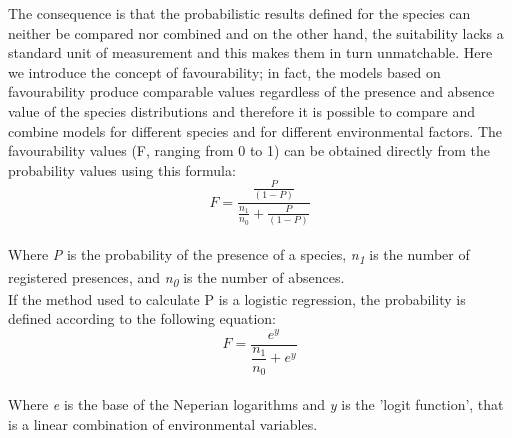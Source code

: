 \documentclass[12pt,a4paper]{article}
\begin{document}
The consequence is that the probabilistic results defined for the species can neither be compared nor combined and on the other hand, the suitability lacks a standard unit of measurement and this makes them in turn unmatchable.
Here we introduce the concept of favourability; in fact, the models based on favourability produce comparable values regardless of the presence and absence value of the species distributions and therefore it is possible to compare and combine models for different species and for different environmental factors.
The favourability values (F, ranging from 0 to 1) can be obtained directly from the probability values using this formula:
\\ \[ F=\dfrac{\frac{P}{(1-P)}}{\frac{n_1}{n_0}+\frac{P}{(1-P)}}\] \\

Where \textit{P} is the probability of the presence of a species, \textit{n\textsubscript{1}} is the number of registered presences, and \textit{n\textsubscript{0}} is the number of absences.\\
If the method used to calculate P is a logistic regression, the probability is defined according to the following equation:
\\ \[    F=\dfrac{e^y}{\dfrac{n_1}{n_0}+{e^y}}          \] \\

Where \textit{e} is the base of the Neperian logarithms and \textit{y} is the 'logit function', that is a linear combination of environmental variables.
\end{document}
